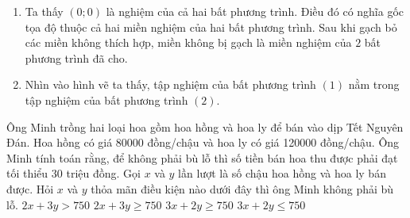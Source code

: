 \begin{ex}
{\begin{enumerate}[--]
\begin{center}
\begin{tikzpicture}[>=stealth,line join=round,line cap=round,font=\footnotesize,scale=0.7]
            \end{tikzpicture}
        \end{center}
        \item Ta thấy $(0;0)$ là nghiệm của cả hai bất phương trình. Điều đó có nghĩa gốc tọa độ thuộc cả hai miền nghiệm của hai bất phương trình. Sau khi gạch bỏ các miền không thích hợp, miền không bị gạch là miền nghiệm của $2$ bất phương trình đã cho.
        \item Nhìn vào hình vẽ ta thấy, tập nghiệm của bất phương trình $(1)$ nằm trong tập nghiệm của bất phương trình $(2)$.      
    \end{enumerate}
    }
\end{ex}
\begin{ex}%
    Ông Minh trồng hai loại hoa gồm hoa hồng và hoa ly để bán vào dịp Tết Nguyên Đán. Hoa hồng có giá $80000$ đồng/chậu và hoa ly có giá 120000 đồng/chậu. Ông Minh tính toán rằng, để không phải bù lỗ thì số tiền bán hoa thu được phải đạt tối thiểu $30$ triệu đồng. Gọi $x$ và $y$ lần lượt là số chậu hoa hồng và hoa ly bán được. Hỏi $x$ và $y$ thỏa mãn điều kiện nào dưới đây thì ông Minh không phải bù lỗ.
    \choice
    {$2x+3y>750$}
    {\True $2x+3y \geq 750$}
    {$3x+2y \geq 750$}
    {$3x+2y \leq 750$}
\end{ex}
